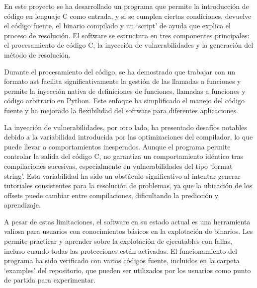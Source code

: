 En este proyecto se ha desarrollado un programa que permite la introducción de código en lenguaje C como entrada, y si se cumplen ciertas condiciones, devuelve el código fuente, el binario compilado y un `script' de ayuda que explica el proceso de resolución.
El software se estructura en tres componentes principales: el procesamiento de código C, la inyección de vulnerabilidades y la generación del método de resolución.

Durante el procesamiento del código, se ha demostrado que trabajar con un formato \acrfull{ast} facilita significativamente la gestión de las llamadas a funciones y permite la inyección nativa de definiciones de funciones, llamadas a funciones y código arbitrario en Python. Este enfoque ha simplificado el manejo del código fuente y ha mejorado la flexibilidad del software para diferentes aplicaciones.

La inyección de vulnerabilidades, por otro lado, ha presentado desafíos notables debido a la variabilidad introducida por las optimizaciones del compilador, lo que puede llevar a comportamientos inesperados. Aunque el programa permite controlar la salida del código C, no garantiza un comportamiento idéntico tras compilaciones sucesivas, especialmente en vulnerabilidades del tipo ‘format string’. Esta variabilidad ha sido un obstáculo significativo al intentar generar tutoriales consistentes para la resolución de problemas, ya que la ubicación de los offsets puede cambiar entre compilaciones, dificultando la predicción y aprendizaje.

A pesar de estas limitaciones, el software en su estado actual es una herramienta valiosa para usuarios con conocimientos básicos en la explotación de binarios. Les permite practicar y aprender sobre la explotación de ejecutables con fallas, incluso cuando todas las protecciones están activadas.
El funcionamiento del programa ha sido verificado con varios códigos fuente, incluidos en la carpeta ‘examples’ del repositorio, que pueden ser utilizados por los usuarios como punto de partida para experimentar.